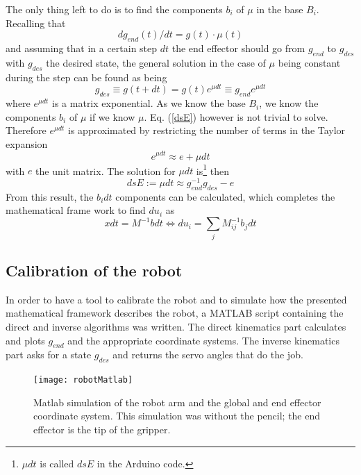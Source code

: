 \documentclass[a4paper,11pt,oneside,onecolumn]{article}
\begin{document}
The only thing left to do is to find the components $b_i$ of $\mu$ in the base $B_i$. Recalling that 
\begin{equation}
dg_{end}(t)/dt=g(t)\cdot \mu(t)
\end{equation}
and assuming that in a certain step $dt$ the end effector should go from $g_{end}$ to $g_{des}$ with $g_{des}$ the desired state, the general solution in the case of $\mu$ being constant during the step can be found as being
\begin{equation}
g_{des} \equiv g(t+dt)=g(t)e^{\mu dt} \equiv g_{end}e^{\mu dt}
\label{dsE}
\end{equation}
where $e^{\mu dt}$ is a matrix exponential. As we know the base $B_i$, we know the components $b_i$ of $\mu$ if we know $\mu$. Eq. (\ref{dsE}) however is not trivial to solve. Therefore $e^{\mu dt}$ is approximated by restricting the number of terms in the Taylor expansion
\begin{equation}
e^{\mu dt} \approx e+\mu dt
\end{equation}
with $e$ the unit matrix. The solution for $\mu dt$ is\footnote{$\mu dt$ is called $dsE$ in the Arduino code.} then
\begin{equation}
dsE := \mu dt \approx g_{end}^{-1}g_{des}-e 
\end{equation}
From this result, the $b_i dt$ components can be calculated, which completes the mathematical frame work to find $du_i$ as
\begin{equation}
x dt= M^{-1} b dt \Leftrightarrow  du_i = \sum_j M^{-1}_{ij}b_j dt
\end{equation}

\subsection{Calibration of the robot}

In order to have a tool to calibrate the robot and to simulate how the presented mathematical framework describes the robot, a MATLAB script containing the direct and inverse algorithms was written. The direct kinematics part calculates and plots $g_{end}$ and the appropriate coordinate systems. The inverse kinematics part asks for a state $g_{des}$ and returns the servo angles that do the job.
\begin{figure}[h]
	\centering
		\texttt{[image: robotMatlab]}
	\caption{Matlab simulation of the robot arm and the global and end effector coordinate system. This simulation was without the pencil; the end effector is the tip of the gripper.}
	\label{fig:robotMatlab}
\end{figure} 
\end{document}
